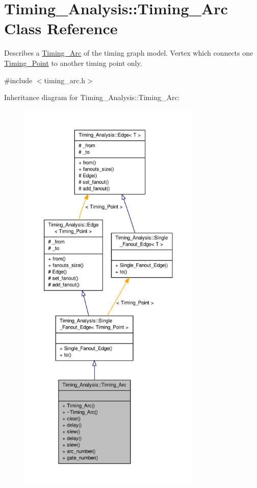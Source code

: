 \hypertarget{classTiming__Analysis_1_1Timing__Arc}{\section{Timing\-\_\-\-Analysis\-:\-:Timing\-\_\-\-Arc Class Reference}
\label{classTiming__Analysis_1_1Timing__Arc}
}


Describes a \hyperlink{classTiming__Analysis_1_1Timing__Arc}{Timing\-\_\-\-Arc} of the timing graph model. Vertex which connects one \hyperlink{classTiming__Analysis_1_1Timing__Point}{Timing\-\_\-\-Point} to another timing point only.  




{\ttfamily \#include $<$timing\-\_\-arc.\-h$>$}



Inheritance diagram for Timing\-\_\-\-Analysis\-:\-:Timing\-\_\-\-Arc\-:\nopagebreak
\begin{figure}[H]
\begin{center}
\leavevmode
\includegraphics[height=550pt]{classTiming__Analysis_1_1Timing__Arc__inherit__graph}
\end{center}
\end{figure}


